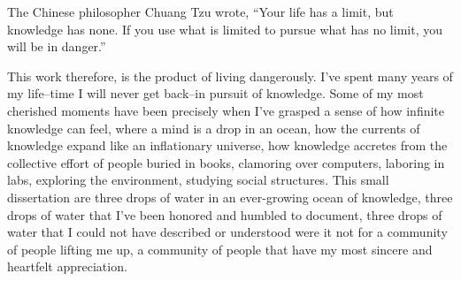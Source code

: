 \begin{frontmatter}
\maketitle

\copyrightpage


\tableofcontents
\listoffigures
\listoftables

    \newpage
    \begin{inlineabstract}
		\myabstract
		
    \end{inlineabstract}

\begin{acknowledgments}
	
The Chinese philosopher Chuang Tzu wrote, ``Your life has a limit, but knowledge has none. If you use what is limited to pursue what has no limit, you will be in danger.'' 

This work therefore, is the product of living dangerously. I've spent many years of my life--time I will never get back--in pursuit of knowledge. Some of my most cherished moments have been precisely when I've grasped a sense of how infinite knowledge can feel, where a mind is a drop in an ocean, how the currents of knowledge expand like an inflationary universe, how knowledge accretes from the collective effort of people buried in books, clamoring over computers, laboring in labs, exploring the environment, studying social structures. This small dissertation are three drops of water in an ever-growing ocean of knowledge, three drops of water that I've been honored and humbled to document, three drops of water that I could not have described or understood were it not for a community of people lifting me up, a community of people that have my most sincere and heartfelt appreciation. 


\end{acknowledgments}
\end{frontmatter}
